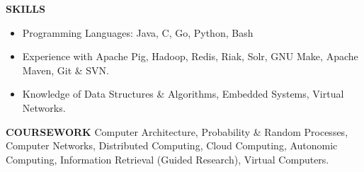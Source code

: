 \documentclass[10pt, letterpaper]{article}
\begin{document}
\textbf{SKILLS}
\smallskip 
\begin{itemize}
    \item Programming Languages: Java, C, Go, Python, Bash
    \item Experience with Apache Pig, Hadoop, Redis, Riak, Solr, GNU Make, Apache Maven, Git \& SVN.
    \item Knowledge of Data Structures \& Algorithms, Embedded Systems, Virtual Networks.
\end{itemize} 

\textbf{COURSEWORK}
\smallskip 
\newline
Computer Architecture, Probability \& Random Processes, Computer Networks, 
Distributed Computing, Cloud Computing, Autonomic Computing, Information Retrieval (Guided Research), Virtual Computers.
\end{document}
